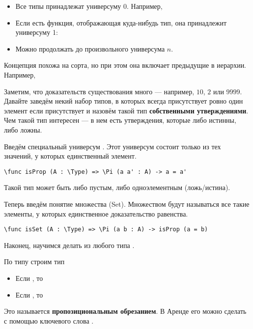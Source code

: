 \begin{itemize}
    \item Все типы принадлежат универсуму 0. Например, 
    \item Если есть функция, отображающая куда-нибудь тип, она принадлежит универсуму 1: 
    \item Можно продолжать до произвольного универсума $n$.
\end{itemize}

Концепция похожа на сорта, но при этом она включает предыдущие в иерархии. Например, 

\medskip
Заметим, что доказательств существования  много --- например, $10$, $2$ или $9999$.
Давайте заведём некий набор типов, в которых всегда присутствует ровно один элемент если присутствует и назовём такой тип \textbf{собственными утверждениями}.
Чем такой тип интересен --- в нем есть утверждения, которые либо истинны, либо ложны.

Введём специальный универсум . Этот универсум состоит только из тех значений, у которых единственный элемент.

\begin{verbatim}
\func isProp (A : \Type) => \Pi (a a' : A) -> a = a'
\end{verbatim}

Такой тип может быть либо пустым, либо одноэлементным (ложь/истина).

Теперь введём понятие множества (Set). Множеством будут называться все такие элементы, у которых единственное доказательство равенства.

\begin{verbatim}
\func isSet (A : \Type) => \Pi (a b : A) -> isProp (a = b)
\end{verbatim}

Наконец, научимся делать из любого типа .

По типу  строим тип 
\begin{itemize}
    \item Если , то 
    \item Если , то 
\end{itemize}
Это называется \textbf{пропозициональным обрезанием}. В Аренде его можно сделать с помощью ключевого слова \ard{\truncated}.




